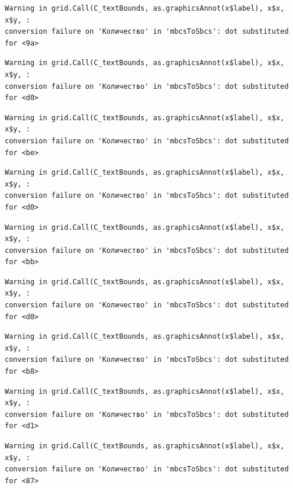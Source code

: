 \documentclass[
  letterpaper,
]{scrbook}
\theoremstyle{definition}
\theoremstyle{remark}
\begin{document}
\begin{verbatim}
Warning in grid.Call(C_textBounds, as.graphicsAnnot(x$label), x$x, x$y, :
conversion failure on 'Количество' in 'mbcsToSbcs': dot substituted for <9a>
\end{verbatim}

\begin{verbatim}
Warning in grid.Call(C_textBounds, as.graphicsAnnot(x$label), x$x, x$y, :
conversion failure on 'Количество' in 'mbcsToSbcs': dot substituted for <d0>
\end{verbatim}

\begin{verbatim}
Warning in grid.Call(C_textBounds, as.graphicsAnnot(x$label), x$x, x$y, :
conversion failure on 'Количество' in 'mbcsToSbcs': dot substituted for <be>
\end{verbatim}

\begin{verbatim}
Warning in grid.Call(C_textBounds, as.graphicsAnnot(x$label), x$x, x$y, :
conversion failure on 'Количество' in 'mbcsToSbcs': dot substituted for <d0>
\end{verbatim}

\begin{verbatim}
Warning in grid.Call(C_textBounds, as.graphicsAnnot(x$label), x$x, x$y, :
conversion failure on 'Количество' in 'mbcsToSbcs': dot substituted for <bb>
\end{verbatim}

\begin{verbatim}
Warning in grid.Call(C_textBounds, as.graphicsAnnot(x$label), x$x, x$y, :
conversion failure on 'Количество' in 'mbcsToSbcs': dot substituted for <d0>
\end{verbatim}

\begin{verbatim}
Warning in grid.Call(C_textBounds, as.graphicsAnnot(x$label), x$x, x$y, :
conversion failure on 'Количество' in 'mbcsToSbcs': dot substituted for <b8>
\end{verbatim}

\begin{verbatim}
Warning in grid.Call(C_textBounds, as.graphicsAnnot(x$label), x$x, x$y, :
conversion failure on 'Количество' in 'mbcsToSbcs': dot substituted for <d1>
\end{verbatim}

\begin{verbatim}
Warning in grid.Call(C_textBounds, as.graphicsAnnot(x$label), x$x, x$y, :
conversion failure on 'Количество' in 'mbcsToSbcs': dot substituted for <87>
\end{verbatim}
\end{document}
